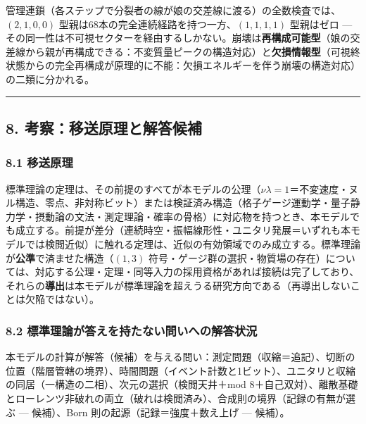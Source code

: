 \documentclass[
]{ltjsarticle}
\begin{document}
管理連鎖（各ステップで分裂者の線が娘の交差線に渡る）の全数検査では、\((2,1,0,0)\)
型親は68本の完全連続経路を持つ一方、\((1,1,1,1)\) 型親はゼロ ---
その同一性は不可視セクターを経由するしかない。崩壊は\textbf{再構成可能型}（娘の交差線から親が再構成できる：不変質量ピークの構造対応）と\textbf{欠損情報型}（可視終状態からの完全再構成が原理的に不能：欠損エネルギーを伴う崩壊の構造対応）の二類に分かれる。

\begin{center}\rule{0.5\linewidth}{0.5pt}\end{center}

\subsection{8.
考察：移送原理と解答候補}\label{ux8003ux5bdfux79fbux9001ux539fux7406ux3068ux89e3ux7b54ux5019ux88dc}

\subsubsection{8.1 移送原理}\label{ux79fbux9001ux539fux7406}

標準理論の定理は、その前提のすべてが本モデルの公理（\(\nu\lambda=1\)＝不変速度・ヌル構造、零点、非対称ビット）または検証済み構造（格子ゲージ運動学・量子静力学・摂動論の文法・測定理論・確率の骨格）に対応物を持つとき、本モデルでも成立する。前提が差分（連続時空・振幅線形性・ユニタリ発展＝いずれも本モデルでは検閲近似）に触れる定理は、近似の有効領域でのみ成立する。標準理論が\textbf{公準}で済ませた構造（\((1,3)\)
符号・ゲージ群の選択・物質場の存在）については、対応する公理・定理・同等入力の採用資格があれば接続は完了しており、それらの\textbf{導出}は本モデルが標準理論を超えうる研究方向である（再導出しないことは欠陥ではない）。

\subsubsection{8.2
標準理論が答えを持たない問いへの解答状況}\label{ux6a19ux6e96ux7406ux8ad6ux304cux7b54ux3048ux3092ux6301ux305fux306aux3044ux554fux3044ux3078ux306eux89e3ux7b54ux72b6ux6cc1}

本モデルの計算が解答（候補）を与える問い：測定問題（収縮＝追記）、切断の位置（階層管轄の境界）、時間問題（イベント計数と1ビット）、ユニタリと収縮の同居（一構造の二相）、次元の選択（検閲天井＋mod
8＋自己双対）、離散基礎とローレンツ非破れの両立（破れは検閲済み）、合成則の境界（記録の有無が選ぶ
--- 候補）、Born 則の起源（記録＝強度＋数え上げ --- 候補）。
\end{document}
